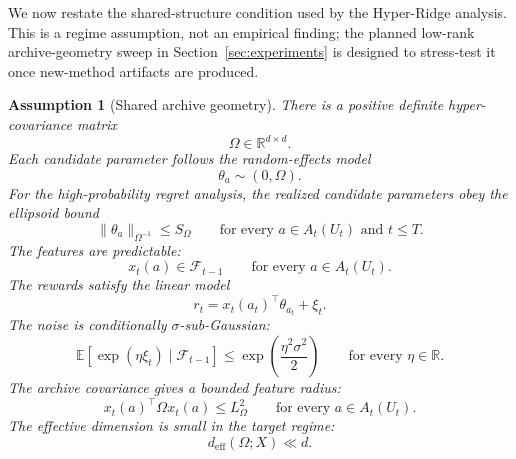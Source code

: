 \documentclass{article} %
\newtheorem{assumption}{Assumption}
\begin{document}
We now restate the shared-structure condition used by the Hyper-Ridge analysis.  This is a regime assumption, not an empirical finding; the planned low-rank archive-geometry sweep in Section~\ref{sec:experiments} is designed to stress-test it once new-method artifacts are produced.

\begin{assumption}[Shared archive geometry]
\label{assump:shared-structure-app}
There is a positive definite hyper-covariance matrix
\begin{equation}
\label{eq:hyper-assump-omega}
\Omega\in\mathbb{R}^{d\times d}.
\end{equation}
Each candidate parameter follows the random-effects model
\begin{equation}
\label{eq:hyper-assump-random}
\theta_a\sim(0,\Omega).
\end{equation}
For the high-probability regret analysis, the realized candidate parameters obey the ellipsoid bound
\begin{equation}
\label{eq:hyper-assump-ellipsoid}
\|\theta_a\|_{\Omega^{-1}}
\le
S_{\Omega}
\qquad
\text{for every } a\in A_t(U_t)\text{ and }t\le T .
\end{equation}
The features are predictable:
\begin{equation}
\label{eq:hyper-assump-predictable}
x_t(a)\in\mathcal{F}_{t-1}
\qquad
\text{for every }a\in A_t(U_t).
\end{equation}
The rewards satisfy the linear model
\begin{equation}
\label{eq:hyper-assump-linear}
r_t=x_t(a_t)^\top\theta_{a_t}+\xi_t .
\end{equation}
The noise is conditionally \(\sigma\)-sub-Gaussian:
\begin{equation}
\label{eq:hyper-assump-subg}
\mathbb{E}
\!\left[
\exp(\eta\xi_t)\mid\mathcal{F}_{t-1}
\right]
\le
\exp\!\left(\frac{\eta^2\sigma^2}{2}\right)
\qquad
\text{for every }\eta\in\mathbb{R}.
\end{equation}
The archive covariance gives a bounded feature radius:
\begin{equation}
\label{eq:hyper-assump-radius}
x_t(a)^\top\Omega x_t(a)
\le
L_{\Omega}^2
\qquad
\text{for every }a\in A_t(U_t).
\end{equation}
The effective dimension is small in the target regime:
\begin{equation}
\label{eq:hyper-assump-small-deff}
d_{\mathrm{eff}}(\Omega;X)
\ll
d .
\end{equation}
\end{assumption}
\end{document}

